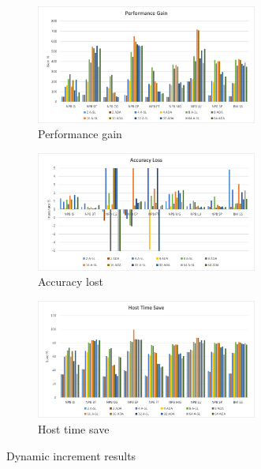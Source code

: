 \begin{figure}[H]
\centering
\begin{subfigure}{\textwidth}
    \centering
    \includegraphics[width=0.8\textwidth]{Images/Performance_ADA_INC.png}
    \caption{ Performance gain}
    \label{fig:Performance_ADAINC}
\end{subfigure}
\begin{subfigure}{\textwidth}
    \centering
    \includegraphics[width=0.8\textwidth]{Images/Accuracy_ADA_INC.png}
    \caption{ Accuracy lost}
    \label{fig:Accuracy_ADAINC}
\end{subfigure}
\begin{subfigure}{\textwidth}
    \centering
    \includegraphics[width=0.8\textwidth]{Images/Host_ADA_INC.png}
    \caption{ Host time save}
    \label{fig:Host_ADAINC}
\end{subfigure}
        
\caption{Dynamic increment results}
\label{fig:results_ADAINC}
\end{figure}

